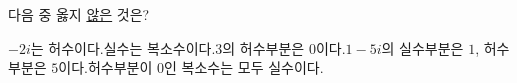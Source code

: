 다음 중 옳지 \underline{않은} 것은?
\begin{choicesv}{$-2i$는 허수이다.}{실수는 복소수이다.}{$3$의 허수부분은 $0$이다.}{$1-5i$의 실수부분은 $1$, 허수부분은 $5$이다.}{허수부분이 $0$인 복소수는 모두 실수이다.}\end{choicesv}
